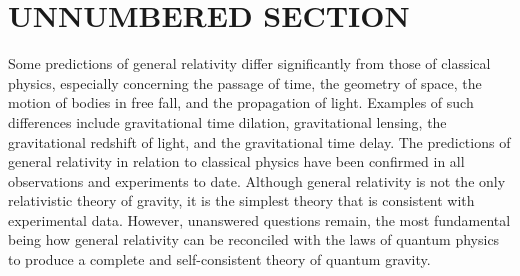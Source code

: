 \newcommand{\mylanguages}{english,italian} %
\newcommand{\mytitle}{Stereophonic Mathematical Models}
\newcommand{\mysubtitle}{Stereophonic Mathematical Models}
\newcommand{\authorone}{Perla Catucci}
\newcommand{\institutione}{Conservatorio N. Piccinni di Bari}
\newcommand{\emailone}{perlacatucci150 @ gmail.com}
\newcommand{\authortwo}{Michele Ruzzi}
\newcommand{\institutiontwo}{Conservatorio N. Piccinni di Bari}
\newcommand{\emailtwo}{m.ruzzi @ icloud.com} %
\newcommand{\authorthree}{Giuseppe Silvi}
\newcommand{\institutionthree}{Conservatorio N. Piccinni di Bari}
\newcommand{\emailthree}{grammaton @ me.com} %


\maketitle
\thispagestyle{empty}
\section*{UNNUMBERED SECTION}
Some predictions of general relativity differ significantly from those of
classical physics, especially concerning the passage of time, the geometry of
space, the motion of bodies in free fall, and the propagation of light. Examples
of such differences include gravitational time dilation, gravitational lensing,
the gravitational redshift of light, and the gravitational time delay. The
predictions of general relativity in relation to classical physics have been
confirmed in all observations and experiments to date. Although general
relativity is not the only relativistic theory of gravity, it is the simplest
theory that is consistent with experimental data. However, unanswered questions
remain, the most fundamental being how general relativity can be reconciled with
the laws of quantum physics to produce a complete and self-consistent theory of
quantum gravity.
